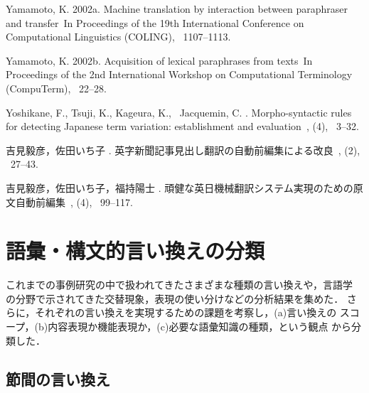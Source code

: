 \begin{thebibliography}{}
Yamamoto, K. \BBOP 2002a\BBCP.
\newblock \BBOQ Machine translation by interaction between paraphraser and
  transfer\BBCQ\
\newblock In {\Bem Proceedings of the 19th International Conference on
  Computational Linguistics {\rm (}COLING\/{\rm )}}, \BPGS\ 1107--1113.

Yamamoto, K. \BBOP 2002b\BBCP.
\newblock \BBOQ Acquisition of lexical paraphrases from texts\BBCQ\
\newblock In {\Bem Proceedings of the 2nd International Workshop on
  Computational Terminology {\rm (}CompuTerm\/{\rm )}}, \BPGS\ 22--28.

Yoshikane, F., Tsuji, K., Kageura, K., \BBA\ Jacquemin, C. \BBOP 2003\BBCP.
\newblock \BBOQ Morpho-syntactic rules for detecting Japanese term variation:
  establishment and evaluation\BBCQ\
\newblock \Jem{自然言語処理}, {\Bbf 10}  (4), \BPGS\ 3--32.

吉見毅彦，佐田いち子 \BBCP.
\newblock \JBOQ 英字新聞記事見出し翻訳の自動前編集による改良\JBCQ\
\newblock {}, {}  (2), \BPGS\ 27--43.

吉見毅彦，佐田いち子，福持陽士 \BBOP 2000\BBCP.
\newblock \JBOQ 頑健な英日機械翻訳システム実現のための原文自動前編集\JBCQ\
\newblock {}, {}  (4), \BPGS\ 99--117.

\end{thebibliography}

\appendix

\section{語彙・構文的言い換えの分類}
\label{app:taxonomy}


これまでの事例研究の中で扱われてきたさまざまな種類の言い換えや，言語学
の分野で示されてきた交替現象，表現の使い分けなどの分析結果を集めた．
さらに，それぞれの言い換えを実現するための課題を考察し，(a)言い換えの
スコープ，(b)内容表現か機能表現か，(c)必要な語彙知識の種類，という観点
から分類した．





\subsection{節間の言い換え}
\label{ssec:category1}

